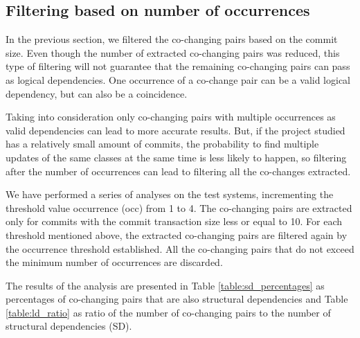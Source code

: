 \subsection{Filtering based on number of occurrences}
\label{sec:filterocc}

In the previous section, we filtered the co-changing pairs based on the commit size. Even though the number of extracted co-changing pairs was reduced, this type of filtering will not guarantee that the remaining co-changing pairs can pass as logical dependencies. 
One occurrence of a co-change pair can be a valid logical dependency, but can also be a coincidence. 

Taking into consideration only co-changing pairs with multiple occurrences as valid dependencies can lead to more accurate results. But, if the project studied has a relatively small amount of commits, the probability to find multiple updates of the same classes at the same time is less likely to happen, so filtering after the number of occurrences can lead to filtering all the co-changes extracted.

We have performed a series of analyses on the test systems, incrementing the threshold value occurrence (occ) from 1 to 4. The co-changing pairs are extracted only for commits with the commit transaction size less or equal to 10. For each threshold mentioned above, the extracted co-changing pairs are filtered again by the occurrence threshold established. All the co-changing pairs that do not exceed the minimum number of occurrences are discarded.

The results of the analysis are presented in Table \ref{table:sd_percentages} as percentages of co-changing pairs that are also structural dependencies and Table \ref{table:ld_ratio} as ratio of the number of co-changing pairs to the number of structural dependencies (SD).


